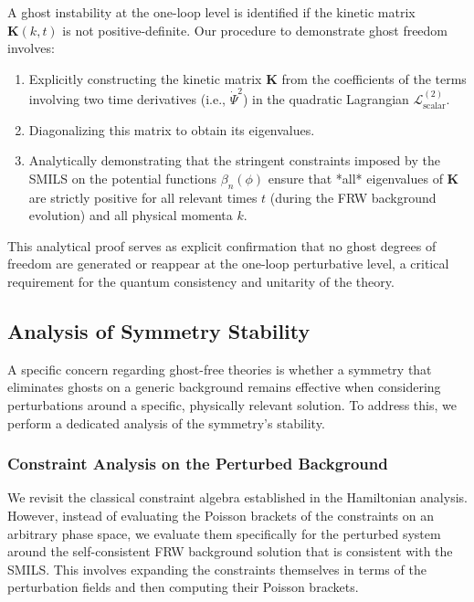 \documentclass[twocolumn]{aastex631}
\begin{document}
A ghost instability at the one-loop level is identified if the kinetic matrix $\mathbf{K}(k,t)$ is not positive-definite. Our procedure to demonstrate ghost freedom involves:
\begin{enumerate}
    \item Explicitly constructing the kinetic matrix $\mathbf{K}$ from the coefficients of the terms involving two time derivatives (i.e., $\dot{\Psi}^2$) in the quadratic Lagrangian $\mathcal{L}^{(2)}_{\text{scalar}}$.
    \item Diagonalizing this matrix to obtain its eigenvalues.
    \item Analytically demonstrating that the stringent constraints imposed by the SMILS on the potential functions $\beta_n(\phi)$ ensure that *all* eigenvalues of $\mathbf{K}$ are strictly positive for all relevant times $t$ (during the FRW background evolution) and all physical momenta $k$.
\end{enumerate}
This analytical proof serves as explicit confirmation that no ghost degrees of freedom are generated or reappear at the one-loop perturbative level, a critical requirement for the quantum consistency and unitarity of the theory.

\subsection{Analysis of Symmetry Stability}
A specific concern regarding ghost-free theories is whether a symmetry that eliminates ghosts on a generic background remains effective when considering perturbations around a specific, physically relevant solution. To address this, we perform a dedicated analysis of the symmetry's stability.

\subsubsection{Constraint Analysis on the Perturbed Background}
We revisit the classical constraint algebra established in the Hamiltonian analysis. However, instead of evaluating the Poisson brackets of the constraints on an arbitrary phase space, we evaluate them specifically for the perturbed system around the self-consistent FRW background solution that is consistent with the SMILS. This involves expanding the constraints themselves in terms of the perturbation fields and then computing their Poisson brackets.
\end{document}
